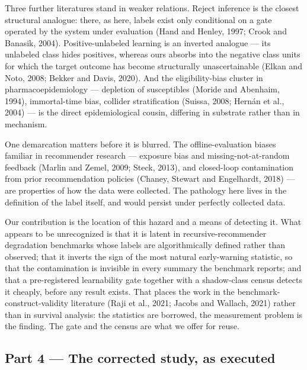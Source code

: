 \documentclass[
  11pt,
]{article}
\begin{document}
Three further literatures stand in weaker relations. Reject inference is
the closest structural analogue: there, as here, labels exist only
conditional on a gate operated by the system under evaluation (Hand and
Henley, 1997; Crook and Banasik, 2004). Positive-unlabeled learning is
an inverted analogue --- its unlabeled class hides positives, whereas
ours absorbs into the negative class units for which the target outcome
has become structurally unascertainable (Elkan and Noto, 2008; Bekker
and Davis, 2020). And the eligibility-bias cluster in
pharmacoepidemiology --- depletion of susceptibles (Moride and Abenhaim,
1994), immortal-time bias, collider stratification (Suissa, 2008; Hernán
et al., 2004) --- is the direct epidemiological cousin, differing in
substrate rather than in mechanism.

One demarcation matters before it is blurred. The offline-evaluation
biases familiar in recommender research --- exposure bias and
missing-not-at-random feedback (Marlin and Zemel, 2009; Steck, 2013),
and closed-loop contamination from prior recommendation policies
(Chaney, Stewart and Engelhardt, 2018) --- are properties of how the
data were collected. The pathology here lives in the definition of the
label itself, and would persist under perfectly collected data.

Our contribution is the location of this hazard and a means of detecting
it. What appears to be unrecognized is that it is latent in
recursive-recommender degradation benchmarks whose labels are
algorithmically defined rather than observed; that it inverts the sign
of the most natural early-warning statistic, so that the contamination
is invisible in every summary the benchmark reports; and that a
pre-registered learnability gate together with a shadow-class census
detects it cheaply, before any result exists. That places the work in
the benchmark-construct-validity literature (Raji et al., 2021; Jacobs
and Wallach, 2021) rather than in survival analysis: the statistics are
borrowed, the measurement problem is the finding. The gate and the
census are what we offer for reuse.

\subsection{Part 4 --- The corrected study, as
executed}\label{part-4-the-corrected-study-as-executed}
\end{document}
